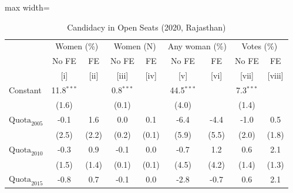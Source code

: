
\begin{table}[htbp]
   \centering
   \scriptsize
   \begin{adjustbox}{max width=\linewidth}
      \begin{threeparttable}[b]
         \caption{\label{tab:candidacy_combined} Candidacy in Open Seats (2020, Rajasthan)}
         \bigskip
         \begin{tabular}{lcccccccc}
            \toprule
             & \multicolumn{2}{c}{Women (\%)} & \multicolumn{2}{c}{Women (N)} & \multicolumn{2}{c}{Any woman (\%)} & \multicolumn{2}{c}{Votes (\%)} \\
                                                                                                     & No FE        & FE    & No FE       & FE    & No FE        & FE    & No FE       & FE \\
                                                                                                     & [i]          & [ii]  & [iii]       & [iv]  & [v]          & [vi]  & [vii]       & [viii]\\
            \midrule
            Constant                                                                                 & 11.8$^{***}$ &       & 0.8$^{***}$ &       & 44.5$^{***}$ &       & 7.3$^{***}$ &   \\
                                                                                                     & (1.6)        &       & (0.1)       &       & (4.0)        &       & (1.4)       &   \\
            $\text{Quota}_{2005}$                                                                    & -0.1         & 1.6   & 0.0         & 0.1   & -6.4         & -4.4  & -1.0        & 0.5\\
                                                                                                     & (2.5)        & (2.2) & (0.2)       & (0.1) & (5.9)        & (5.5) & (2.0)       & (1.8)\\
            $\text{Quota}_{2010}$                                                                    & -0.3         & 0.9   & -0.1        & 0.0   & -0.7         & 1.2   & 0.6         & 2.1\\
                                                                                                     & (1.5)        & (1.4) & (0.1)       & (0.1) & (4.5)        & (4.2) & (1.4)       & (1.3)\\
            $\text{Quota}_{2015}$                                                                    & -0.8         & 0.7   & -0.1        & 0.0   & -2.8         & -0.7  & 0.6         & 2.1\\

\end{tabular}
\end{threeparttable}
\end{adjustbox}
\end{table}

